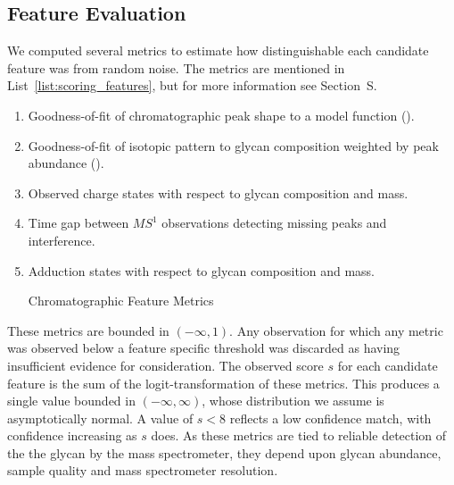\subsection{Feature Evaluation}
    We computed several metrics to estimate
    how distinguishable each candidate feature was from random noise. The
    metrics are mentioned in List~\ref{list:scoring_features}, but for more
    information see Section~S.
    \begin{ordlist}
    \begin{enumerate}
        \itemsep0em
        \item Goodness-of-fit of chromatographic peak shape to a model function
              (\cite{Yu2010,Kronewitter2014}).
        \item Goodness-of-fit of isotopic pattern to glycan composition weighted
              by peak abundance (\cite{Maxwell2012}).
        \item Observed charge states with respect to glycan composition and mass.
        \item Time gap between $MS^1$ observations detecting missing peaks
              and interference.
        \item Adduction states with respect to glycan composition and mass.
        \caption{Chromatographic Feature Metrics\label{list:scoring_features}}
    \end{enumerate}
    \end{ordlist}

    These metrics are bounded in $(-\infty, 1)$. Any observation for which any metric
    was observed below a feature specific threshold was discarded as having insufficient
    evidence for consideration. The observed score $s$ for each candidate feature is
    the sum of the logit-transformation of these metrics. This produces a single
    value bounded in $(-\infty, \infty)$, whose distribution we assume is asymptotically
    normal. A value of $s < 8$ reflects a low confidence match, with confidence increasing
    as $s$ does. As these metrics are tied to reliable detection of the the glycan
    by the mass spectrometer, they depend upon glycan abundance, sample quality and
    mass spectrometer resolution.
